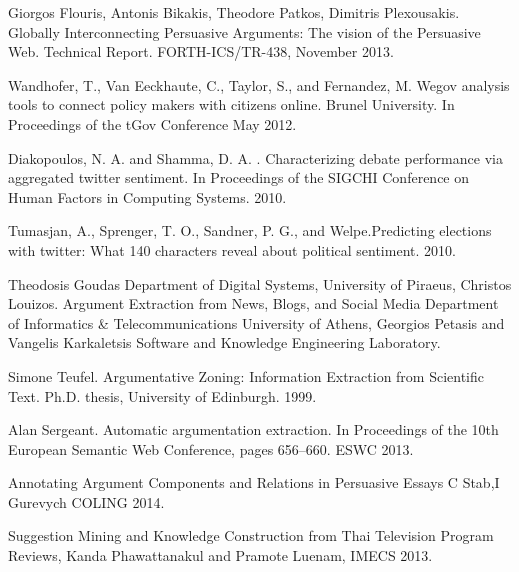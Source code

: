 \begin{thebibliography}{69}

 Giorgos Flouris, Antonis Bikakis, Theodore Patkos, Dimitris Plexousakis. Globally Interconnecting Persuasive Arguments: The vision of the Persuasive Web. Technical Report. FORTH-ICS/TR-438, November 2013.

 Wandhofer, T., Van Eeckhaute, C., Taylor, S., and Fernandez, M.  Wegov analysis tools to connect policy makers with citizens online. Brunel University. In Proceedings of the tGov Conference May 2012.

 Diakopoulos, N. A. and Shamma, D. A. . Characterizing debate performance via aggregated twitter sentiment. In Proceedings of the SIGCHI Conference on Human Factors in Computing Systems. 2010.

 Tumasjan, A., Sprenger, T. O., Sandner, P. G., and Welpe.Predicting elections with twitter: What 140 characters reveal about political sentiment. 2010.

 Theodosis Goudas Department of Digital Systems, University of Piraeus, Christos Louizos. Argument Extraction from News, Blogs, and Social Media  Department of Informatics \& Telecommunications University of Athens, Georgios Petasis  and Vangelis Karkaletsis Software and Knowledge Engineering Laboratory.

 Simone Teufel.  Argumentative Zoning: Information Extraction from Scientific Text. Ph.D. thesis, University of Edinburgh. 1999.

 Alan Sergeant.  Automatic argumentation extraction. In Proceedings of the 10th European Semantic Web Conference, pages 656–660. ESWC 2013.

 Annotating Argument Components and Relations in Persuasive Essays C Stab,I Gurevych COLING 2014.

 Suggestion Mining and Knowledge Construction from Thai Television Program Reviews, Kanda Phawattanakul and Pramote Luenam, IMECS 2013.


\end{thebibliography}
